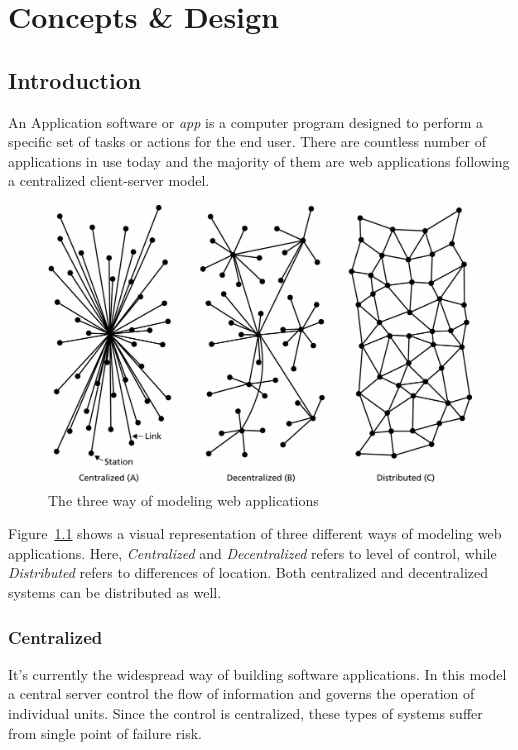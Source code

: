 \chapter{Concepts \& Design}\label{chapter::app-concepts-design}

\section{Introduction}
	An Application software or \textit{app} is a computer program designed to perform a specific set of tasks or actions for the end user. There are countless number of applications in use today and the majority of them are web applications following a centralized client-server model\cite{raval2016decentralized}.
	
	\begin{figure}[h]
		\includegraphics[width=\linewidth]{figures/network-models}
		\caption{\label{fig:applications} The three way of modeling web applications}
	\end{figure}
	
	Figure~\ref{fig:applications} shows a visual representation of three different ways of modeling web applications\cite{baran1964distributed}. Here, \textit{Centralized} and \textit{Decentralized} refers to level of control, while \textit{Distributed} refers to differences of location. Both centralized and decentralized systems can be distributed as well.
	
	\subsection{Centralized}
	It's currently the widespread way of building software applications. In this model a central server control the flow of information and governs the operation of individual units. Since the control is centralized, these types of systems suffer from single point of failure risk.
	
